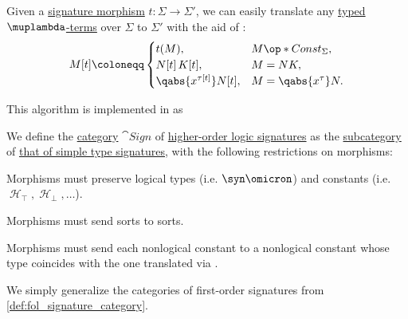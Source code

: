 \begin{algorithm}\label{alg:simply_typed_term_signature_translation}
  Given a \hyperref[def:simple_type_signature_category]{signature morphism} \( t: \Sigma \to \Sigma' \), we can easily translate any \hyperref[def:typed_lambda_term]{typed \( \muplambda \)-terms} over \( \Sigma \) to \( \Sigma' \) with the aid of :
  \begin{equation*}
    M[t] \coloneqq \begin{cases}
      t(M),                     &M \op*{Const}_\Sigma, \\
      N[t] \thinspace K[t],     &M = NK, \\
      \qabs {x^{\tau[t]}} N[t], &M = \qabs {x^\tau} N.
    \end{cases}
  \end{equation*}
\end{algorithm}
\begin{comments}
  \item This algorithm is implemented in \cite{notebook:code} as
  \begin{CodeRefDisplay}
  \end{CodeRefDisplay}
\end{comments}

\begin{definition}\label{def:hol_signature_category}\mimprovised
  We define the \hyperref[def:category]{category} \( \cat{Sign} \) of \hyperref[def:hol_signature]{higher-order logic signatures} as the \hyperref[def:subcategory]{subcategory} of \hyperref[def:simple_type_signature_category]{that of simple type signatures}, with the following restrictions on morphisms:
  \begin{thmenum}
     Morphisms must preserve logical types (i.e. \( \syn\omicron \)) and constants (i.e. \( \mscrH_\top, \mscrH_\bot, \ldots \)).

     Morphisms must send sorts to sorts.

     Morphisms must send each nonlogical constant to a nonlogical constant whose type coincides with the one translated via .
  \end{thmenum}
\end{definition}
\begin{comments}
  \item We simply generalize the categories of first-order signatures from \cref{def:fol_signature_category}.
\end{comments}

